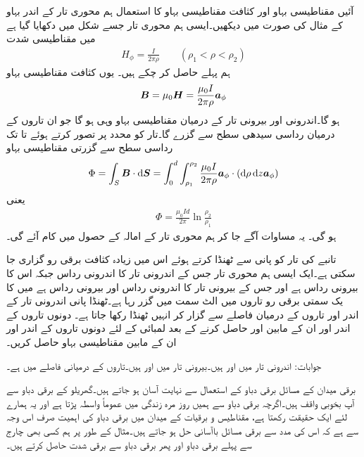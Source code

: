 آئیں مقناطیسی بہاو اور کثافت مقناطیسی بہاو کا استعمال ہم محوری تار کے اندر بہاو کے مثال کی صورت میں دیکھیں۔ایسی ہم محوری تار جسے شکل  میں دکھایا گیا ہے میں مقناطیسی شدت
\begin{align*}
H_{\phi}=\frac{I}{2\pi \rho} \quad \quad (\rho_1 < \rho < \rho_2)
\end{align*}
ہم پہلے حاصل کر چکے ہیں۔ یوں کثافت مقناطیسی بہاو
\begin{align*}
{\ensuremath{{\boldsymbol{B}}}}=\mu_0 {{\boldsymbol{H}}}=\frac{\mu_0 I}{2\pi \rho} {\boldsymbol{a}}_{\phi}
\end{align*}
ہو گا۔اندرونی اور بیرونی تار کے درمیان مقناطیسی بہاو وہی ہو گا جو ان تاروں کے درمیان رداسی سیدھی سطح سے گزرے گا۔تار کو  محدد پر تصور کرتے ہوئے  تا  تک رداسی سطح سے گزرتی مقناطیسی بہاو
\begin{align*}
\Phi=\int_S \kvec{B} \cdot \dif \kvec{S}=\int_{0}^{d} \int_{\rho_1}^{\rho_2} \frac{\mu_0 I}{2\pi \rho} \aphi \cdot (\dif \rho \dif z \aphi)
\end{align*}
یعنی
\begin{align}
\Phi=\frac{\mu_0 I d}{2\pi} \ln \frac{\rho_2}{\rho_1}
\end{align}
ہو گی۔ یہ مساوات آگے جا کر ہم محوری تار کے امالہ کے حصول میں کام آئے گی۔

تانبے کی تار کو پانی سے ٹھنڈا کرتے ہوئے اس میں زیادہ کثافت برقی رو گزاری جا سکتی ہے۔ایک ایسی ہم محوری تار جس کے اندرونی تار کا اندرونی رداس  جبکہ اس کا بیرونی رداس  ہے اور جس کے بیرونی تار کا اندرونی رداس  اور بیرونی رداس  ہے میں  کا یک سمتی برقی رو تاروں میں الٹ سمت میں گزر رہا ہے۔ٹھنڈا پانی اندرونی تار کے اندر اور تاروں کے درمیان فاصلے سے گزار کر انہیں ٹھنڈا رکھا جاتا ہے۔ دونوں تاروں کے اندر اور ان کے مابین  اور  حاصل کرنے کے بعد   لمبائی کے  لئے  دونوں تاروں کے اندر اور ان کے مابین  مقناطیسی بہاو حاصل کریں۔

جوابات: اندرونی تار میں  اور  ہیں۔بیرونی تار میں  اور  ہیں۔تاروں کے درمیانی فاصلے میں  ہے۔

برقی میدان کے مسائل برقی دباو کے استعمال سے نہایت آسان ہو جاتے ہیں۔گھریلو  کے برقی دباو سے آپ بخوبی واقف ہیں۔اگرچہ برقی دباو سے ہمیں روز مرہ زندگی میں عموماً واسطہ پڑتا ہے اور یہ ہمارے لئے ایک حقیقت رکھتا ہے، مقناطیس و برقیات کے میدان میں برقی دباو کی اہمیت صرف اس وجہ سے ہے کہ اس کی مدد سے برقی مسائل باآسانی حل ہو جاتے ہیں۔مثال کے طور پر ہم کسی بھی چارج سے پہلے برقی دباو اور پھر برقی دباو سے برقی شدت حاصل کرتے ہیں۔

